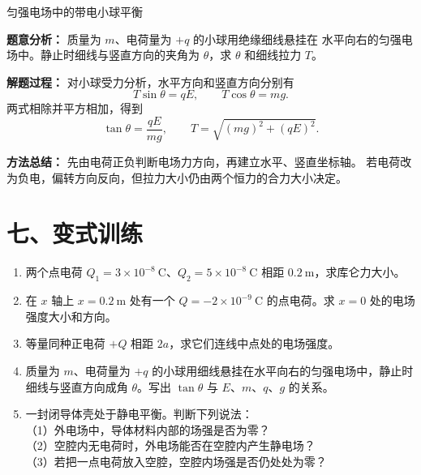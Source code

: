 \begin{examplebox}{匀强电场中的带电小球平衡}

\textbf{题意分析：} 质量为 $m$、电荷量为 $+q$ 的小球用绝缘细线悬挂在
水平向右的匀强电场中。静止时细线与竖直方向的夹角为 $\theta$，求
$\theta$ 和细线拉力 $T$。

\begin{center}


\label{fig:example-charged-pendulum-field}
\end{center}

\textbf{解题过程：} 对小球受力分析，水平方向和竖直方向分别有
\[
T\sin\theta=qE,\qquad T\cos\theta=mg.
\]
两式相除并平方相加，得到
\[
\boxed{\tan\theta=\frac{qE}{mg}},\qquad
\boxed{T=\sqrt{(mg)^2+(qE)^2}}.
\]

\textbf{方法总结：} 先由电荷正负判断电场力方向，再建立水平、竖直坐标轴。
若电荷改为负电，偏转方向反向，但拉力大小仍由两个恒力的合力大小决定。

\end{examplebox}

\section*{七、变式训练}

\begin{enumerate}
  \item 两个点电荷 $Q_1 = 3 \times 10^{-8}\ \mathrm{C}$、$Q_2 = 5 \times 10^{-8}\ \mathrm{C}$ 相距 $0.2\ \mathrm{m}$，求库仑力大小。

  \item 在 $x$ 轴上 $x = 0.2\ \mathrm{m}$ 处有一个 $Q = -2 \times 10^{-9}\ \mathrm{C}$ 的点电荷。求 $x = 0$ 处的电场强度大小和方向。
  \begin{center}
  
  \end{center}

  \item 等量同种正电荷 $+Q$ 相距 $2a$，求它们连线中点处的电场强度。
  \begin{center}
  
  \end{center}

  \item 质量为 $m$、电荷量为 $+q$ 的小球用细线悬挂在水平向右的匀强电场中，静止时细线与竖直方向成角 $\theta$。写出 $\tan\theta$ 与 $E$、$m$、$q$、$g$ 的关系。

  \item 一封闭导体壳处于静电平衡。判断下列说法：\\
  （1）外电场中，导体材料内部的场强是否为零？\\
  （2）空腔内无电荷时，外电场能否在空腔内产生静电场？\\
  （3）若把一点电荷放入空腔，空腔内场强是否仍处处为零？
\end{enumerate}

